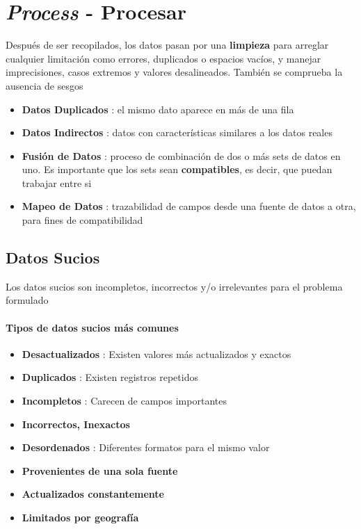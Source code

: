 
\section{\textit{Process} - Procesar}
Después de ser recopilados, los datos pasan por una \textbf{limpieza} para arreglar cualquier limitación como errores, duplicados o espacios vacíos, y manejar imprecisiones, casos extremos y valores desalineados. También se comprueba la ausencia de sesgos
\begin{itemize}
    \item {\textbf{Datos Duplicados} : el mismo dato aparece en más de una fila}
    \item {\textbf{Datos Indirectos} : datos con características similares a los datos reales}
    \item {\textbf{Fusión de Datos} : proceso de combinación de dos o más sets de datos en uno. Es importante que los sets sean \textbf{compatibles}, es decir, que puedan trabajar entre si}
    \item {\textbf{Mapeo de Datos} : trazabilidad de campos desde una fuente de datos a otra, para fines de compatibilidad}
\end{itemize}

\subsection{Datos Sucios}
Los datos sucios son incompletos, incorrectos y/o irrelevantes para el problema formulado
\paragraph{Tipos de datos sucios más comunes}
\begin{itemize}
    \item {\textbf{Desactualizados} : Existen valores más actualizados y exactos}
    \item {\textbf{Duplicados} : Existen registros repetidos}
    \item {\textbf{Incompletos} : Carecen de campos importantes}
    \item {\textbf{Incorrectos, Inexactos}}
    \item {\textbf{Desordenados} : Diferentes formatos para el mismo valor}
    \item {\textbf{Provenientes de una sola fuente}}
    \item {\textbf{Actualizados constantemente}}
    \item {\textbf{Limitados por geografía}}
\end{itemize}

